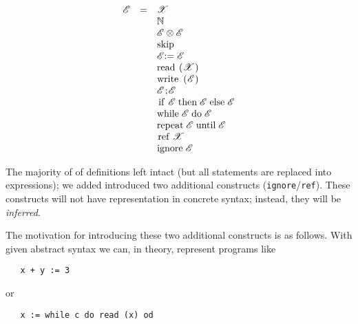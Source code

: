 \documentclass{article}
\newcommand{\llang}[1]{\mbox{\lstinline[mathescape]|#1|}}
\theoremstyle{definition}
\begin{document}
\[
\begin{array}{rcl}
   \mathscr E & = & \mathscr X                                                            \\
              &   & \mathbb N                                                             \\
              &   & \mathscr E \otimes \mathscr E                                         \\
              &   & \mbox{\lstinline|skip|}                                               \\
              &   & \mathscr E \mbox{\lstinline|:=|} \;\mathscr E                         \\
              &   & \mbox{\lstinline|read (|} \mathscr X \mbox{\lstinline|)|}             \\
              &   & \mbox{\lstinline|write (|} \mathscr E \mbox{\lstinline|)|}            \\
              &   & \mathscr E \mbox{\lstinline|;|} \mathscr E                            \\
              &   & \llang{if $\;\mathscr E\;$ then $\;\mathscr E\;$ else $\;\mathscr E$} \\
              &   & \llang{while $\;\mathscr E\;$ do $\;\mathscr E$}                      \\
              &   & \llang{repeat $\;\mathscr E\;$ until $\;\mathscr E$}                  \\
              &   & \llang{ref $\;\mathscr X$}                                            \\
              &   & \llang{ignore $\;\mathscr E$}
\end{array}
\]

The majority of of definitions left intact (but all statements are replaced into expressions); we added introduced two additional
constructs (\llang{ignore}/\llang{ref}). These constructs will not have representation in concrete syntax; instead, they will be
\emph{inferred}.

The motivation for introducing these two additional constructs is as follows. With given abstract syntax we can, in theory, represent programs like

\begin{lstlisting}
   x + y := 3
\end{lstlisting}

or

\begin{lstlisting}
   x := while c do read (x) od
\end{lstlisting}
\end{document}
